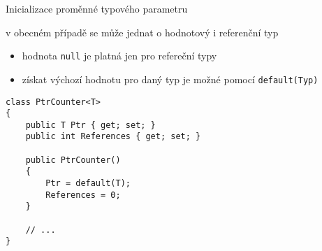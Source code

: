 \begin{frame}[fragile]
\begin{bitemize}{Inicializace proměnné typového parametru}
\item v obecném případě se může jednat o hodnotový i referenční typ
\begin{itemize}
\item hodnota \lstinline|null| je platná jen pro refereční typy
\item získat výchozí hodnotu pro daný typ je možné pomocí \lstinline|default(Typ)|
\end{itemize}
\end{bitemize}
\vfill
\begin{yesblock}
\begin{lstlisting}
class PtrCounter<T>
{
    public T Ptr { get; set; }
    public int References { get; set; }

    public PtrCounter()
    {
        Ptr = default(T);
        References = 0;
    }

    // ...
}
\end{lstlisting}
\end{yesblock}
\end{frame}

